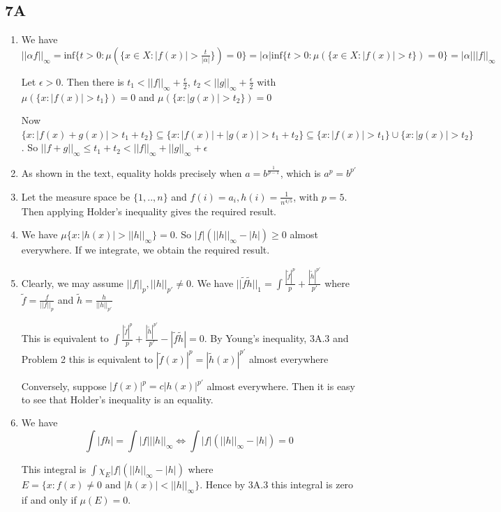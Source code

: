 \documentclass{article}
\begin{document}
\subsection*{7A}
\begin{enumerate}
    \item We have $||\alpha f||_\infty=\text{inf}\{t>0:\mu(\{x \in X:|f(x)|>\frac{t}{|\alpha|}\})=0\}=|\alpha|\text{inf}\{t>0:\mu(\{x \in X:|f(x)|>t\})=0\}=|\alpha|||f||_\infty$

    Let $\epsilon>0$. Then there is $t_1<||f||_\infty+\frac{\epsilon}{2}$, $t_2<||g||_\infty+\frac{\epsilon}{2}$ with $\mu(\{x:|f(x)|>t_1\})=0$ and $\mu(\{x:|g(x)|>t_2\})=0$

    Now $\{x:|f(x)+g(x)|>t_1+t_2\}\subseteq \{x:|f(x)|+|g(x)|>t_1+t_2\}\subseteq \{x:|f(x)|>t_1\}\cup\{x:|g(x)|>t_2\}$. So $||f+g||_\infty \leq t_1+t_2<||f||_\infty+||g||_\infty +\epsilon$

    \item As shown in the text, equality holds precisely when $a=b^{\frac{1}{p-1}}$, which is $a^p=b^{p'}$ 

    \item Let the measure space be $\{1,..,n\}$ and $f(i)=a_i,h(i)=\frac{1}{n^{4/5}}$, with $p=5$. Then applying Holder's inequality gives the required result.

    \item We have $\mu\{x:|h(x)|>||h||_\infty\}=0$. So $|f|(||h||_\infty-|h|)\geq 0$ almost everywhere. If we integrate, we obtain the required result.

    \item Clearly, we may assume $||f||_p,||h||_{p'}\neq0$. We have $||\tilde{f}\tilde{h}||_1=\int \frac{|\tilde{f}|^p}{p}+\frac{|\tilde{h}|^{p'}}{p'}$ where $\tilde{f}=\frac{f}{||f||_p}$ and $\tilde{h}=\frac{h}{||h||_{p'}}$

    This is equivalent to $\int \frac{|\tilde{f}|^p}{p}+\frac{|\tilde{h}|^{p'}}{p'}-|\tilde{f}\tilde{h}|=0$. By Young's inequality, 3A.3 and Problem 2 this is equivalent to $|\tilde{f}(x)|^p=|\tilde{h}(x)|^{p'}$ almost everywhere

    Conversely, suppose $|f(x)|^p=c|h(x)|^{p'}$ almost everywhere. Then it is easy to see that Holder's inequality is an equality.

    \item We have \[\int|fh|=\int |f|||h||_\infty\iff \int |f|(||h||_\infty-|h|)=0 \]

    This integral is $\int \chi_E |f|(||h||_\infty-|h|)$ where $E=\{x:f(x)\neq 0 \text{ and }|h(x)|<||h||_\infty\}$. Hence by 3A.3 this integral is zero if and only if $\mu(E)=0$.


\end{enumerate}
\end{document}
